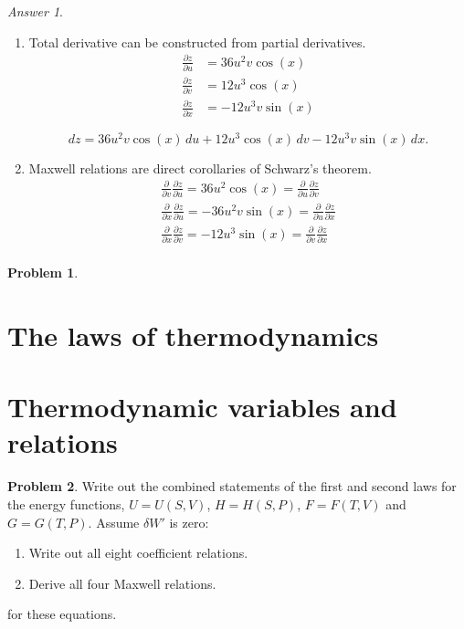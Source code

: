 \documentclass[a4paper, 12pt]{article}
\theoremstyle{definition}
\newtheorem{problem}{Problem}[section]
\theoremstyle{remark}
\newtheorem*{answer}{Answer}
\begin{document}
\begin{answer}
    \begin{enumerate}
        \item Total derivative can be constructed from partial derivatives.
            \begin{align*}
                \frac{\partial z}{\partial u} &= 36 u^2 v \cos(x) \\
                \frac{\partial z}{\partial v} &= 12 u^3 \cos(x) \\
                \frac{\partial z}{\partial x} &= -12 u^3 v \sin(x)
            \end{align*}

            \[ dz = 36 u^2 v \cos(x) \,du
                + 12 u^3 \cos(x) \,dv
                - 12 u^3 v \sin(x) \,dx.\]

        \item Maxwell relations are direct corollaries of Schwarz's theorem.
            \[
                \begin{gathered}
                    \frac\partial{\partial v}\frac{\partial z}{\partial u}
                        = 36 u^2 \cos(x)
                        = \frac\partial{\partial u}\frac{\partial z}{\partial v} \\
                    \frac\partial{\partial x}\frac{\partial z}{\partial u}
                        = -36 u^2 v \sin(x)
                        = \frac\partial{\partial u}\frac{\partial z}{\partial x} \\
                    \frac\partial{\partial x}\frac{\partial z}{\partial v}
                        = -12 u^3 \sin(x)
                        = \frac\partial{\partial v}\frac{\partial z}{\partial x} \\
                \end{gathered}
            \]
    \end{enumerate}
\end{answer}

\begin{problem}
\end{problem}

\section{The laws of thermodynamics}

\section{Thermodynamic variables and relations}
\begin{problem}
    Write out the combined statements of the first and second laws for the
    energy functions, $U = U(S, V)$, $H = H(S, P)$, $F = F(T, V)$ and $G = G(T,
    P)$.  Assume $\delta W'$ is zero:
    \begin{enumerate}
        \item Write out all eight coefficient relations.
        \item Derive all four Maxwell relations.
    \end{enumerate}
    for these equations.
\end{problem}
\end{document}
